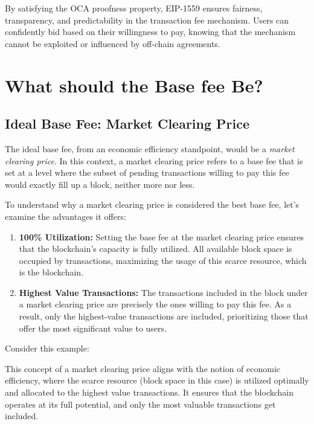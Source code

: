 By satisfying the OCA proofness property, EIP-1559 ensures fairness, transparency, and predictability in the transaction fee mechanism. Users can confidently bid based on their willingness to pay, knowing that the mechanism cannot be exploited or influenced by off-chain agreements.

\section{What should the Base fee Be?}

\subsection{Ideal Base Fee: Market Clearing Price}
The ideal base fee, from an economic efficiency standpoint, would be a \textit{market clearing price}. In this context, a market clearing price refers to a base fee that is set at a level where the subset of pending transactions willing to pay this fee would exactly fill up a block, neither more nor less.

To understand why a market clearing price is considered the best base fee, let's examine the advantages it offers:

\begin{enumerate}
    \item \textbf{100\% Utilization:} Setting the base fee at the market clearing price ensures that the blockchain's capacity is fully utilized. All available block space is occupied by transactions, maximizing the usage of this scarce resource, which is the blockchain.
    \item \textbf{Highest Value Transactions:} The transactions included in the block under a market clearing price are precisely the ones willing to pay this fee. As a result, only the highest-value transactions are included, prioritizing those that offer the most significant value to users.
\end{enumerate}

Consider this example: 

This concept of a market clearing price aligns with the notion of economic efficiency, where the scarce resource (block space in this case) is utilized optimally and allocated to the highest value transactions. It ensures that the blockchain operates at its full potential, and only the most valuable transactions get included.\\

